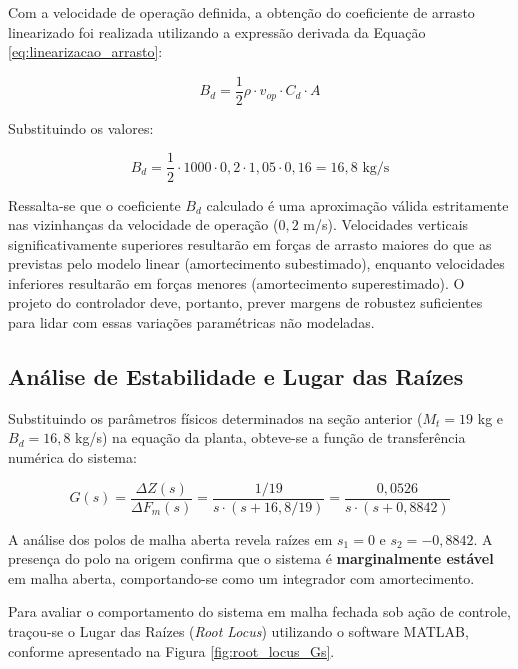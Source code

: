 \documentclass[12pt, a4paper]{article}
\begin{document}
				Com a velocidade de operação definida, a obtenção do coeficiente de arrasto linearizado foi realizada utilizando a expressão derivada da Equação \ref{eq:linearizacao_arrasto}:

				\begin{equation}
					B_d = \frac{1}{2} \rho \cdot v_{op} \cdot C_d \cdot A
				\end{equation}

				Substituindo os valores:

				\begin{equation}
					B_d = \frac{1}{2} \cdot 1000 \cdot 0,2 \cdot 1,05 \cdot 0,16 = 16,8 \text{ kg/s}
				\end{equation}

				Ressalta-se que o coeficiente $B_d$ calculado é uma aproximação válida estritamente nas vizinhanças da velocidade de operação ($0,2$ m/s). Velocidades verticais significativamente superiores resultarão em forças de arrasto maiores do que as previstas pelo modelo linear (amortecimento subestimado), enquanto velocidades inferiores resultarão em forças menores (amortecimento superestimado). O projeto do controlador deve, portanto, prever margens de robustez suficientes para lidar com essas variações paramétricas não modeladas.

		\subsection{Análise de Estabilidade e Lugar das Raízes}

			Substituindo os parâmetros físicos determinados na seção anterior ($M_t = 19$ kg e $B_d = 16,8$ kg/s) na equação da planta, obteve-se a função de transferência numérica do sistema:

			\begin{equation}
				G(s) = \frac{\Delta Z(s)}{\Delta F_{m}(s)} = \frac{1/19}{s \cdot (s + 16,8/19)} = \frac{0,0526}{s \cdot (s + 0,8842)}
				\label{eq:ft_numerica}
			\end{equation}

			A análise dos polos de malha aberta revela raízes em $s_1 = 0$ e $s_2 = -0,8842$. A presença do polo na origem confirma que o sistema é {\bfseries marginalmente estável} em malha aberta, comportando-se como um integrador com amortecimento.

			Para avaliar o comportamento do sistema em malha fechada sob ação de controle, traçou-se o Lugar das Raízes (\textit{Root Locus}) utilizando o software MATLAB, conforme apresentado na Figura \ref{fig:root_locus_Gs}.
\end{document}
